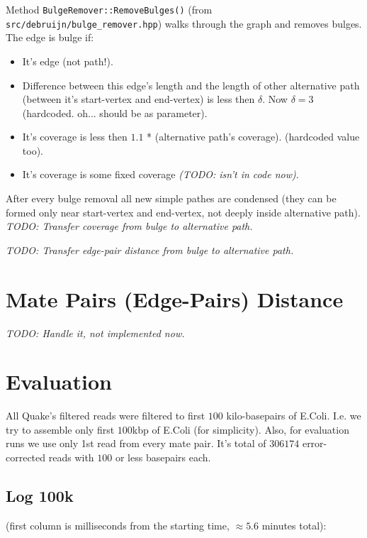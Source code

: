 \documentclass[14pt]{article}
\begin{document}
Method \texttt{BulgeRemover::RemoveBulges()} (from \texttt{src/debruijn/bulge\_remover.hpp}) walks through the graph and removes bulges. The edge is bulge if:
\begin{itemize}
\item It's edge (not path!).
\item Difference between this edge's length and the length of other alternative path (between it's start-vertex and end-vertex) is less then $\delta$. Now $\delta = 3$ (hardcoded. oh... should be as parameter).
\item It's coverage is less then $1.1$ * (alternative path's coverage). (hardcoded value too).
\item It's coverage is some fixed coverage \textit{(TODO: isn't in code now)}.
\end{itemize} \vspace{0.5 cm}

After every bulge removal all new simple pathes are condensed (they can be formed only near start-vertex and end-vertex, not deeply inside alternative path). \\

\textit{TODO: Transfer coverage from bulge to alternative path.}

\textit{TODO: Transfer edge-pair distance from bulge to alternative path.}

\section{Mate Pairs (Edge-Pairs) Distance}

\textit{TODO: Handle it, not implemented now.}

\section{Evaluation}

All Quake's filtered reads were filtered to first $100$ kilo-basepairs of E.Coli. I.e. we try to assemble only first $100$kbp of E.Coli (for simplicity). Also, for evaluation runs we use only 1st read from every mate pair. It's total of $306174$ error-corrected reads with $100$ or less basepairs each.

\subsection{Log 100k}
(first column is milliseconds from the starting time, $\approx 5.6$ minutes total): \\
\end{document}

